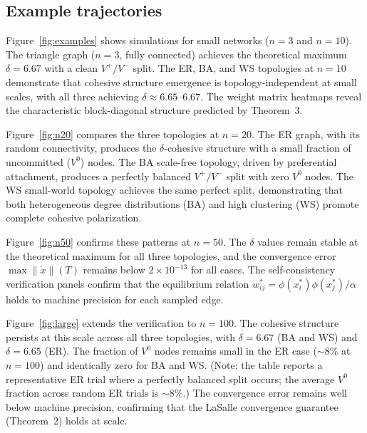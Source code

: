 \documentclass[3p]{elsarticle}
\begin{document}
\subsection{Example trajectories}

Figure~\ref{fig:examples} shows simulations for small networks ($n=3$ and $n=10$). The triangle graph ($n=3$, fully connected) achieves the theoretical maximum $\delta = 6.67$ with a clean $V^+/V^-$ split. The ER, BA, and WS topologies at $n=10$ demonstrate that cohesive structure emergence is topology-independent at small scales, with all three achieving $\delta \approx 6.65$--$6.67$. The weight matrix heatmaps reveal the characteristic block-diagonal structure predicted by Theorem~3.

Figure~\ref{fig:n20} compares the three topologies at $n=20$. The ER graph, with its random connectivity, produces the $\delta$-cohesive structure with a small fraction of uncommitted ($V^0$) nodes. The BA scale-free topology, driven by preferential attachment, produces a perfectly balanced $V^+/V^-$ split with zero $V^0$ nodes. The WS small-world topology achieves the same perfect split, demonstrating that both heterogeneous degree distributions (BA) and high clustering (WS) promote complete cohesive polarization.

Figure~\ref{fig:n50} confirms these patterns at $n=50$. The $\delta$ values remain stable at the theoretical maximum for all three topologies, and the convergence error $\max\|\dot x\|(T)$ remains below $2\times 10^{-13}$ for all cases. The self-consistency verification panels confirm that the equilibrium relation $w_{ij}^* = \phi(x_i^*)\phi(x_j^*)/\alpha$ holds to machine precision for each sampled edge.

Figure~\ref{fig:large} extends the verification to $n=100$. The cohesive structure persists at this scale across all three topologies, with $\delta = 6.67$ (BA and WS) and $\delta = 6.65$ (ER). The fraction of $V^0$ nodes remains small in the ER case ($\sim 8\%$ at $n=100$) and identically zero for BA and WS. (Note: the table reports a representative ER trial where a perfectly balanced split occurs; the average $V^0$ fraction across random ER trials is $\sim 8\%$.) The convergence error remains well below machine precision, confirming that the LaSalle convergence guarantee (Theorem~2) holds at scale.
\end{document}
